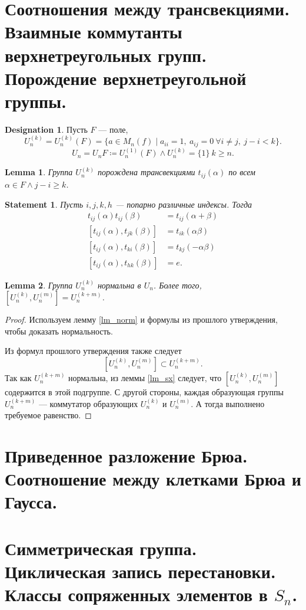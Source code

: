 \documentclass[11pt]{book}
\renewcommand{\ge}{\geqslant}
\theoremstyle{definition}
\theoremstyle{plain}
\theoremstyle{plain}
\newtheorem{lm}{Lemma}
\newtheorem{st}{Statement}
\theoremstyle{definition}
\newtheorem*{name}{Designation}
\theoremstyle{remark}
\begin{document}
\section{Соотношения между трансвекциями. Взаимные коммутанты верхнетреугольных групп. Порождение верхнетреугольной группы.}
\begin{name}
    Пусть $ F$ --- поле,
    \[
	U_n^{(k)} = U_{n}^{(k)}(F)=\{a \in M_{n}(f) \mid a_{ii} = 1, ~ a_{ij} = 0 ~ \forall i \ne j , ~ j - i < k\}
    .\]
    \[
	U_n = U_{n}F \coloneqq U_{n}^{(1)}(F) \wedge U_n^{(k)} = \{1\} ~ k \ge  n
    .\]
\end{name}
\begin{lm}
    Группа $ U_{n}^{(k)}$ порождена трансвекциями $ t_{ij}(\alpha) $ по всем $ \alpha \in F \wedge  j - i \ge k$.
\end{lm}
\begin{st}
    Пусть $ i, j, k, h$ --- попарно различные индексы. Тогда
    \begin{align*}
	t_{ij}(\alpha)t_{ij}(\beta) &= t_{ij}(\alpha+\beta)\\
	[t_{ij}(\alpha), t_{jk}(\beta)] &= t_{ik}(\alpha\beta) \\
	[t_{ij}(\alpha), t_{ki}(\beta)] &= t_{kj}(-\alpha\beta) \\
	[t_{ij}(\alpha), t_{hk}(\beta)] &= e.
    \end{align*}
\end{st}
\begin{lm}
    Группа $ U_{n}^{(k)}$ нормальна в $ U_n$. Более того,  $ [U_{n}^{(k)}, U_{n}^{(m)}] = U_{n}^{(k+m)}$.
\end{lm}
\begin{proof}
    Используем лемму \ref{lm_norm} и формулы из прошлого утверждения, чтобы доказать нормальность.

    Из формул прошлого утверждения также следует
    \[
	[U_{n}^{(k)}, U_{n}^{(m)}] \subset  U_{n}^{(k+m)}
    .\]
    Так как $ U_{n}^{(k+m)}$ нормальна, из леммы \ref{lm_sx} следует, что $ [U_{n}^{(k)}, U_{n}^{(m)}]$ содержится в этой подгруппе. С другой стороны, каждая образующая группы $ U_n^{(k+m)}$ --- коммутатор образующих $ U_{n}^{(k)}$ и $ U_{n}^{(m)}$. А тогда выполнено требуемое равенство.
\end{proof}
\section{Приведенное разложение Брюа. Соотношение между клетками Брюа и Гаусса.}
\section{Симметрическая группа. Циклическая запись перестановки. Классы сопряженных элементов в $ S_n$.}
\end{document}
